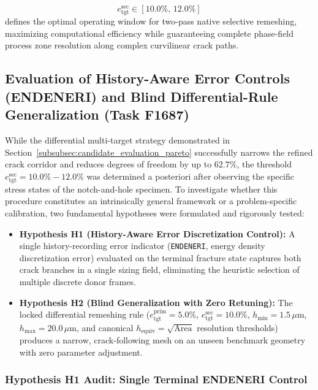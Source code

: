 \begin{enumerate}
  \begin{equation}
    e_{\mathrm{tgt}}^{\mathrm{sec}} \in [10.0\%,\, 12.0\%]
  \end{equation}
  defines the optimal operating window for two-pass native \Abaqus selective remeshing, maximizing computational efficiency while guaranteeing complete phase-field process zone resolution along complex curvilinear crack paths.
\end{enumerate}

\subsection{Evaluation of History-Aware Error Controls (ENDENERI) and Blind Differential-Rule Generalization (Task F1687)}
\label{subsec:f1687_endeneri_and_generalization}

While the differential multi-target strategy demonstrated in Section~\ref{subsubsec:candidate_evaluation_pareto} successfully narrows the refined crack corridor and reduces degrees of freedom by up to $62.7\%$, the threshold $e_{\mathrm{tgt}}^{\mathrm{sec}} = 10.0\% - 12.0\%$ was determined a posteriori after observing the specific stress states of the notch-and-hole specimen. To investigate whether this procedure constitutes an intrinsically general framework or a problem-specific calibration, two fundamental hypotheses were formulated and rigorously tested:
\begin{itemize}
  \item \textbf{Hypothesis H1 (History-Aware Error Discretization Control):} A single history-recording error indicator (\texttt{ENDENERI}, energy density discretization error) evaluated on the terminal fracture state captures both crack branches in a single sizing field, eliminating the heuristic selection of multiple discrete donor frames.
  \item \textbf{Hypothesis H2 (Blind Generalization with Zero Retuning):} The locked differential remeshing rule ($e_{\mathrm{tgt}}^{\mathrm{prim}} = 5.0\%$, $e_{\mathrm{tgt}}^{\mathrm{sec}} = 10.0\%$, $h_{\min} = 1.5\,\mu\mathrm{m}$, $h_{\max} = 20.0\,\mu\mathrm{m}$, and canonical $h_{\mathrm{equiv}} = \sqrt{\mathrm{Area}}$ resolution thresholds) produces a narrow, crack-following mesh on an unseen benchmark geometry with zero parameter adjustment.
\end{itemize}

\subsubsection{Hypothesis H1 Audit: Single Terminal ENDENERI Control}
\label{subsubsec:h1_endeneri_audit}

